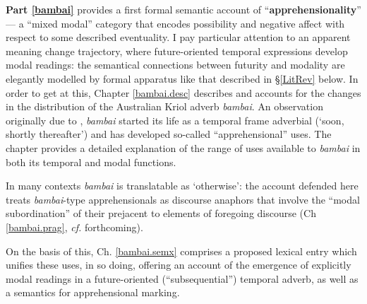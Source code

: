 \documentclass[12pt,dvipsnames]{report}
\begin{document}
\textbf{Part \ref{bambai}} provides a first formal semantic account of ``\textbf{apprehensionality}'' --- a ``mixed modal'' category that encodes possibility and negative affect with respect to some described eventuality. I pay particular attention to an apparent meaning change trajectory, where future-oriented temporal expressions develop modal readings: the semantical connections between futurity and modality are elegantly modelled by formal apparatus like that described in \S \ref{LitRev} below. In order to get at this, Chapter \ref{bambai.desc} describes and accounts for the changes in the distribution of the Australian Kriol adverb \textit{bambai}. An observation originally due to \citet{Angelo2016,Angelo2018}, \textit{bambai} started its life as a temporal frame adverbial (`soon, shortly thereafter') and has developed so-called ``apprehensional'' uses. The chapter provides a detailed explanation of the range of uses available to \textit{bambai} in both its temporal and modal functions. 

In many contexts \textit{bambai} is translatable as `otherwise': the account defended here treats \textit{bambai}-type apprehensionals as discourse anaphors that involve the ``modal subordination'' of their prejacent to elements of foregoing discourse (Ch \ref{bambai.prag}, \textit{cf.} \citet{PhilKotek} forthcoming).

On the basis of this, Ch. \ref{bambai.semx} comprises a proposed lexical entry which unifies these uses, in so doing, offering an account of the emergence of explicitly modal readings in a future-oriented (``subsequential'') temporal adverb, as well as a semantics for apprehensional marking.%
\end{document}

